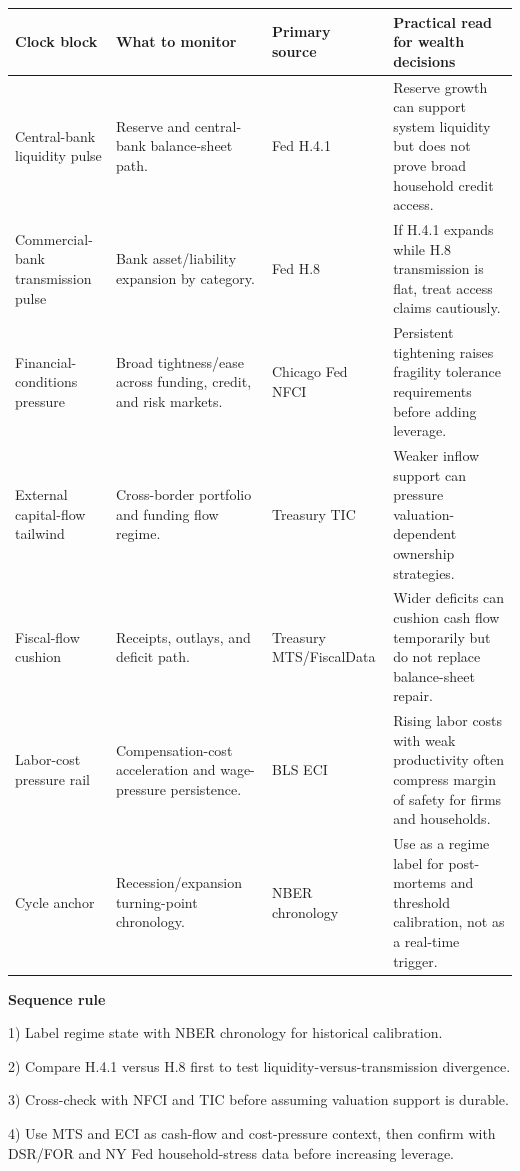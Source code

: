 \documentclass[11pt,openany]{book}
\begin{document}
\begin{center}
\small
\begin{tabularx}{\textwidth}{>{\raggedright\arraybackslash}p{}>{\raggedright\arraybackslash}p{}>{\raggedright\arraybackslash}p{}X}
\toprule
\textbf{Clock block} & \textbf{What to monitor} & \textbf{Primary source} & \textbf{Practical read for wealth decisions} \\
\midrule
Central-bank liquidity pulse & Reserve and central-bank balance-sheet path. & Fed H.4.1 & Reserve growth can support system liquidity but does not prove broad household credit access. \\
Commercial-bank transmission pulse & Bank asset/liability expansion by category. & Fed H.8 & If H.4.1 expands while H.8 transmission is flat, treat access claims cautiously. \\
Financial-conditions pressure & Broad tightness/ease across funding, credit, and risk markets. & Chicago Fed NFCI & Persistent tightening raises fragility tolerance requirements before adding leverage. \\
External capital-flow tailwind & Cross-border portfolio and funding flow regime. & Treasury TIC & Weaker inflow support can pressure valuation-dependent ownership strategies. \\
Fiscal-flow cushion & Receipts, outlays, and deficit path. & Treasury MTS/FiscalData & Wider deficits can cushion cash flow temporarily but do not replace balance-sheet repair. \\
Labor-cost pressure rail & Compensation-cost acceleration and wage-pressure persistence. & BLS ECI & Rising labor costs with weak productivity often compress margin of safety for firms and households. \\
Cycle anchor & Recession/expansion turning-point chronology. & NBER chronology & Use as a regime label for post-mortems and threshold calibration, not as a real-time trigger. \\
\bottomrule
\end{tabularx}
\normalsize
\end{center}

\begin{notebox}
\textbf{Sequence rule}\par
1) Label regime state with NBER chronology for historical calibration.\par
2) Compare H.4.1 versus H.8 first to test liquidity-versus-transmission divergence.\par
3) Cross-check with NFCI and TIC before assuming valuation support is durable.\par
4) Use MTS and ECI as cash-flow and cost-pressure context, then confirm with DSR/FOR and NY Fed household-stress data before increasing leverage.
\end{notebox}
\end{document}
